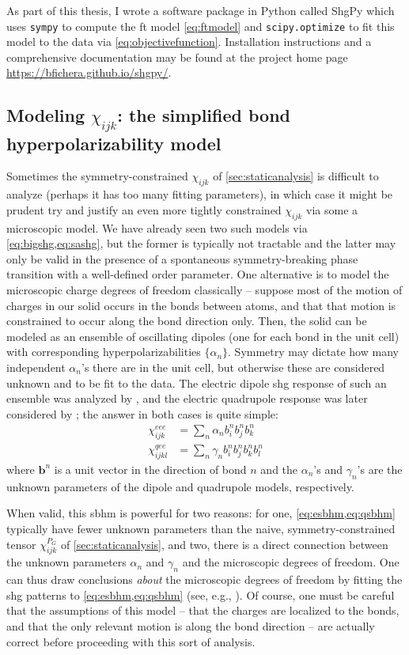 As part of this thesis, I wrote a software package in Python called ShgPy which uses \texttt{sympy}\citep{sympy} to compute the \gls{ft} model \cref{eq:ftmodel} and \texttt{scipy.optimize}\citep{scipy} to fit this model to the data via \cref{eq:objectivefunction}.
Installation instructions and a comprehensive documentation may be found at the project home page \url{https://bfichera.github.io/shgpy/}.

\subsection{Modeling $\chi_{ijk}$: the simplified bond hyperpolarizability model}

Sometimes the symmetry-constrained $\chi_{ijk}$ of \cref{sec:staticanalysis} is difficult to analyze (perhaps it has too many fitting parameters), in which case it might be prudent try and justify an even more tightly constrained $\chi_{ijk}$ via some a microscopic model.
We have already seen two such models via \cref{eq:bigshg,eq:sashg}, but the former is typically not tractable and the latter may only be valid in the presence of a spontaneous symmetry-breaking phase transition with a well-defined order parameter.
One alternative is to model the microscopic charge degrees of freedom classically -- suppose most of the motion of charges in our solid occurs in the bonds between atoms, and that that motion is constrained to occur along the bond direction only.
Then, the solid can be modeled as an ensemble of oscillating dipoles (one for each bond in the unit cell) with corresponding hyperpolarizabilities $\{\alpha_n\}$.
Symmetry may dictate how many independent $\alpha_n$'s there are in the unit cell, but otherwise these are considered unknown and to be fit to the data.
The electric dipole \gls{shg} response of such an ensemble was analyzed by \citet{powell_simplified_2002}, and the electric quadrupole response was later considered by \citet{bauer_bulk_2017}; the answer in both cases is quite simple:
\begin{align}
\chi^{eee}_{ijk} &= \sum_n \alpha_n b^n_i b^n_j b^n_k\label{eq:esbhm}\\
\chi^{qee}_{ijkl} &= \sum_n \gamma_n b^n_i b^n_j b^n_k b^n_l\label{eq:qsbhm}
\end{align}
where $\bm{b}^n$ is a unit vector in the direction of bond $n$ and the $\alpha_n$'s and $\gamma_n$'s are the unknown parameters of the dipole and quadrupole models, respectively.

When valid, this \gls{sbhm} is powerful for two reasons: for one, \cref{eq:esbhm,eq:qsbhm} typically have fewer unknown parameters than the naive, symmetry-constrained tensor $\chi_{ijk}^{P_G}$ of \cref{sec:staticanalysis}, and two, there is a direct connection between the unknown parameters $\alpha_n$ and $\gamma_n$ and the microscopic degrees of freedom.
One can thus draw conclusions \emph{about} the microscopic degrees of freedom by fitting the \gls{shg} patterns to \cref{eq:esbhm,eq:qsbhm} (see, e.g., \citet{ron_dimensional_2019}).
Of course, one must be careful that the assumptions of this model -- that the charges are localized to the bonds, and that the only relevant motion is along the bond direction -- are actually correct before proceeding with this sort of analysis.

